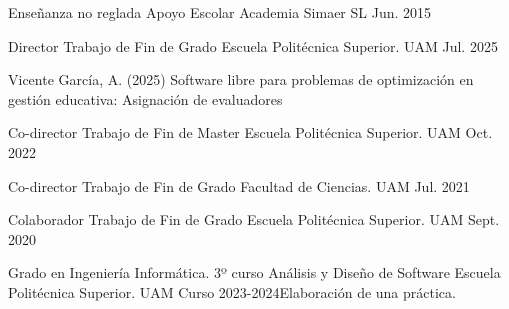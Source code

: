 \begin{cventries}
    

  \cventry
    {Enseñanza no reglada} %
    {Apoyo Escolar} %
    {Academia Simaer SL} %
    {Jun. 2015} %
    {}

  \cventry
	{Director} %
	{Trabajo de Fin de Grado} %
	{Escuela Politécnica Superior. UAM} %
	{Jul. 2025} %
	{
		\begin{cvitems} %
				\item Vicente García, A. (2025) Software libre para problemas de optimización en gestión educativa: Asignación de evaluadores
		\end{cvitems}
	}

  \cventry
	{Co-director} %
	{Trabajo de Fin de Master} %
	{Escuela Politécnica Superior. UAM} %
	{Oct. 2022} %
	{
		\begin{cvitems} %
			\item {}
		\end{cvitems}
	}

  \cventry
	{Co-director} %
	{Trabajo de Fin de Grado} %
	{Facultad de Ciencias. UAM} %
	{Jul. 2021} %
	{
		\begin{cvitems} %
			\item {
			}
		\end{cvitems}
	}

   \cventry
	 {Colaborador} %
	 {Trabajo de Fin de Grado} %
	 {Escuela Politécnica Superior. UAM} %
	 {Sept. 2020} %
	 {
	 	\begin{cvitems} %
	 		\item {}
	 	\end{cvitems}
	 }

   \cventry 
   	{Grado en Ingeniería Informática. 3º curso}
	{Análisis y Diseño de Software} %
	{Escuela Politécnica Superior. UAM} %
	{Curso 2023-2024}{Elaboración de una práctica.}


\end{cventries}
